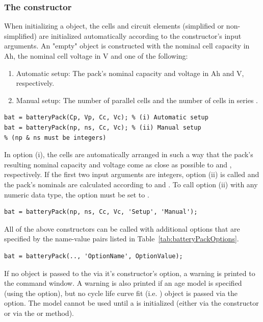 \subsubsection{The  constructor}
\label{sec:batteryPackConstructor}
When initializing a  object, the cells and circuit elements (simplified or non-simplified) are initialized automatically according to the constructor's input arguments. An "empty"  object is constructed with the nominal cell capacity  in Ah, the nominal cell voltage  in V and one of the following:
\begin{enumerate}\renewcommand{\labelenumi}{\roman{enumi})}
	\item Automatic setup: The pack's nominal capacity  and voltage  in Ah and V, respectively. 
	\item Manual setup: The number of parallel cells  and the number of cells in series .
\end{enumerate}
\begin{lstlisting}
bat = batteryPack(Cp, Vp, Cc, Vc); % (i) Automatic setup
bat = batteryPack(np, ns, Cc, Vc); % (ii) Manual setup 
% (np & ns must be integers)
\end{lstlisting}
In option (i), the cells are automatically arranged in such a way that the pack's resulting nominal capacity and voltage come as close as possible to  and , respectively. If the first two input arguments are integers, option (ii) is called and the pack's nominals are calculated according to  and . To call option (ii) with any numeric data type, the  option must be set to .
\begin{lstlisting}
bat = batteryPack(np, ns, Cc, Vc, 'Setup', 'Manual');
\end{lstlisting}
All of the above constructors can be called with additional options that are specified by the name-value pairs listed in Table~\ref{tab:batteryPackOptions}.
\begin{lstlisting}
bat = batteryPack(.., 'OptionName', OptionValue);
\end{lstlisting}
If no  object is passed to the  via it's constructor's  option, a warning is printed to the command window. A warning is also printed if an age model is specified (using the  option), but no cycle life curve fit (i.e. ) object is passed via the  option. The model cannot be used until a  is initialized (either via the constructor or via the  or  method).

